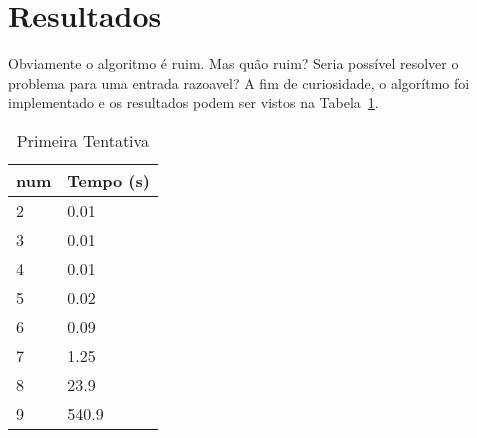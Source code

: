 \documentclass[12pt]{article}
\begin{document}
\section{Resultados}\label{sec:resultados}
Obviamente o algoritmo é ruim. Mas quão ruim? Seria possível resolver o problema para uma entrada razoavel? A fim de curiosidade, o algorítmo foi implementado e os resultados podem ser vistos na Tabela~\ref{tab:resultados-1}.

\begin{table}[h]
\caption{Primeira Tentativa}
\label{tab:resultados-1}
\begin{tabular}{ll}
  {\sf num} & Tempo (s) \\
  \hline
  2 & 0.01 \\
  3 & 0.01 \\
  4 & 0.01 \\
  5 & 0.02 \\
  6 & 0.09 \\
  7 & 1.25 \\
  8 & 23.9 \\
  9 & 540.9    
\end{tabular}
\end{table}
\end{document}
